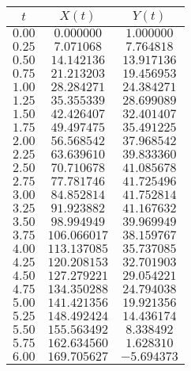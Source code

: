 \begin{tabular}{ccc} \toprule
$t$    & $X(t)$       & $Y(t)$      \\\midrule
$0.00$ & $0.000000$   & $1.000000$  \\
$0.25$ & $7.071068$   & $7.764818$  \\
$0.50$ & $14.142136$  & $13.917136$ \\
$0.75$ & $21.213203$  & $19.456953$ \\
$1.00$ & $28.284271$  & $24.384271$ \\
$1.25$ & $35.355339$  & $28.699089$ \\
$1.50$ & $42.426407$  & $32.401407$ \\
$1.75$ & $49.497475$  & $35.491225$ \\
$2.00$ & $56.568542$  & $37.968542$ \\
$2.25$ & $63.639610$  & $39.833360$ \\
$2.50$ & $70.710678$  & $41.085678$ \\
$2.75$ & $77.781746$  & $41.725496$ \\
$3.00$ & $84.852814$  & $41.752814$ \\
$3.25$ & $91.923882$  & $41.167632$ \\
$3.50$ & $98.994949$  & $39.969949$ \\
$3.75$ & $106.066017$ & $38.159767$ \\
$4.00$ & $113.137085$ & $35.737085$ \\
$4.25$ & $120.208153$ & $32.701903$ \\
$4.50$ & $127.279221$ & $29.054221$ \\
$4.75$ & $134.350288$ & $24.794038$ \\
$5.00$ & $141.421356$ & $19.921356$ \\
$5.25$ & $148.492424$ & $14.436174$ \\
$5.50$ & $155.563492$ & $8.338492$  \\
$5.75$ & $162.634560$ & $1.628310$  \\
$6.00$ & $169.705627$ & $-5.694373$ \\\bottomrule
\end{tabular}
